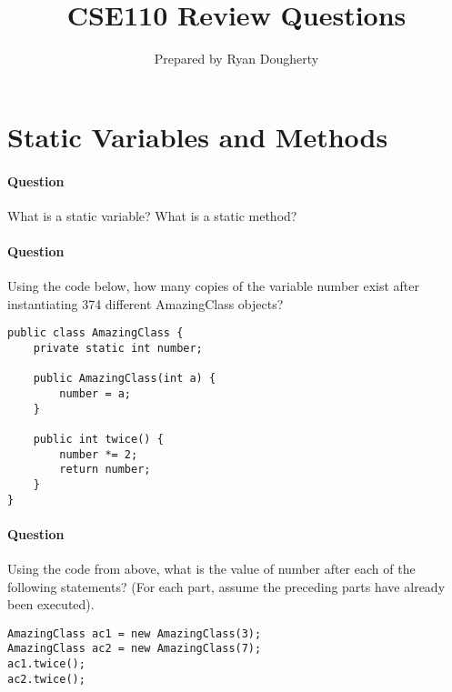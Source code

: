 \documentclass{article}
\title{CSE110 Review Questions}
\author{Prepared by Ryan Dougherty}
\date{}
\begin{document}
\maketitle

\section*{Static Variables and Methods}


\setcounter{question_num}{1}
\paragraph{Question }
What is a static variable? What is a static method?

\addtocounter{question_num}{1}
\paragraph{Question }
Using the code below, how many copies of the variable number exist after instantiating 374 different AmazingClass objects?
\begin{lstlisting}
public class AmazingClass {
	private static int number;

	public AmazingClass(int a) {
		number = a;
	}

	public int twice() {
		number *= 2;
		return number;
	}
}
\end{lstlisting}

\addtocounter{question_num}{1}
\paragraph{Question }
Using the code from above, what is the value of number after each of the following statements? (For each part, assume the preceding parts have already been executed).
\begin{lstlisting}
AmazingClass ac1 = new AmazingClass(3);
AmazingClass ac2 = new AmazingClass(7);
ac1.twice();
ac2.twice();
\end{lstlisting}
\end{document}
